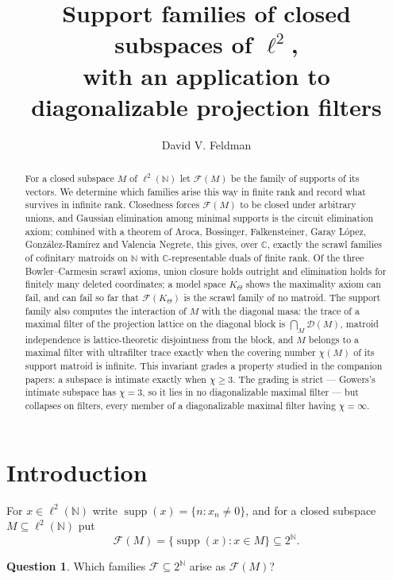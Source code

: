 \documentclass[11pt,reqno]{amsart}
\title[Support families of closed subspaces of $\ell^2$]
{Support families of closed subspaces of $\ell^2$,\\
with an application to diagonalizable projection filters}
\author{David V. Feldman}
\theoremstyle{definition}
\newtheorem{question}[theorem]{Question}
\DeclareMathOperator{\supp}{supp}
\newcommand{\N}{\mathbb{N}}
\newcommand{\C}{\mathbb{C}}
\newcommand{\F}{\mathcal{F}}
\newcommand{\cD}{\mathcal{D}}
\begin{document}
\maketitle

\begin{abstract}
For a closed subspace $M$ of $\ell^2(\N)$ let $\F(M)$ be the family of supports
of its vectors. We determine which families arise this way in finite rank and
record what survives in infinite rank. Closedness forces $\F(M)$ to be closed
under arbitrary unions, and Gaussian elimination among minimal supports is the
circuit elimination axiom; combined with a theorem of Aroca, Bossinger,
Falkensteiner, Garay L\'opez, Gonz\'alez-Ram\'irez and Valencia Negrete, this
gives, over $\C$, exactly the scrawl families of cofinitary matroids on $\N$
with $\C$-representable duals of finite rank. Of the three Bowler--Carmesin
scrawl axioms, union closure holds outright and elimination holds for finitely
many deleted coordinates; a model space $K_\Theta$ shows the maximality axiom
can fail, and can fail so far that $\F(K_\Theta)$ is the scrawl family of no
matroid. The support family also computes the interaction of $M$ with the
diagonal masa: the trace of a maximal filter of the projection lattice on the
diagonal block is $\bigcap_{M}\cD(M)$, matroid independence is
lattice-theoretic disjointness from the block, and $M$ belongs to a maximal
filter with ultrafilter trace exactly when the covering number $\chi(M)$ of its
support matroid is infinite. This invariant grades a property studied in the
companion papers: a subspace is intimate exactly when $\chi\ge3$. The grading is
strict --- Gowers's intimate subspace has $\chi=3$, so it lies in no
diagonalizable maximal filter --- but collapses on filters, every member of a
diagonalizable maximal filter having $\chi=\infty$.
\end{abstract}

\section{Introduction}\label{sec:intro}

For $x\in\ell^2(\N)$ write $\supp(x)=\{n:x_n\neq0\}$, and for a closed subspace
$M\subseteq\ell^2(\N)$ put
\[
\F(M)=\{\supp(x):x\in M\}\subseteq2^{\N}.
\]

\begin{question}\label{q:main}
Which families $\F\subseteq2^{\N}$ arise as $\F(M)$?
\end{question}
\end{document}
